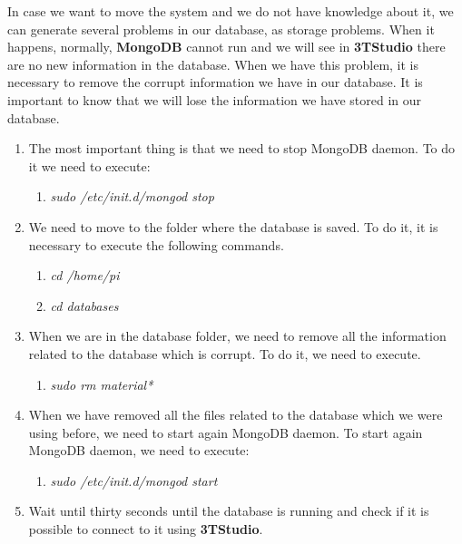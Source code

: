 In case we want to move the system and we do not have knowledge about it, we can generate several problems in our database, as storage problems. When it happens, normally, \textbf{MongoDB} cannot run and we will see in \textbf{3TStudio} there are no new information in the database. When we have this problem, it is necessary to remove the corrupt information we have in our database. It is important to know that we will lose the information we have stored in our database.

\begin{enumerate}

\item The most important thing is that we need to stop MongoDB daemon. To do it we need to execute:

\begin{enumerate}

\item \textit{sudo /etc/init.d/mongod stop}

\end{enumerate}

\item We need to move to the folder where the database is saved. To do it, it is necessary to execute the following commands.

\begin{enumerate}

\item \textit{cd /home/pi}
\item \textit{cd databases}

\end{enumerate}

\item When we are in the database folder, we need to remove all the information related to the database which is corrupt. To do it, we need to execute.

\begin{enumerate}

\item \textit{sudo rm material*}

\end{enumerate}

\item When we have removed all the files related to the database which we were using before, we need to start again MongoDB daemon. To start again MongoDB daemon, we need to execute:

\begin{enumerate}

\item \textit{sudo /etc/init.d/mongod start}

\end{enumerate}

\item Wait until thirty seconds until the database is running and check if it is possible to connect to it using \textbf{3TStudio}.

\end{enumerate}

